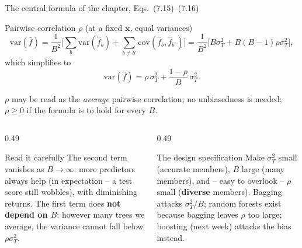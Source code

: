 \documentclass[10pt,aspectratio=169]{beamer}
\newcommand{\var}{\mathrm{var}}
\newcommand{\cov}{\mathrm{cov}}
\begin{document}
\begin{frame}{The central formula of the chapter, Eqs.\ (7.15)--(7.16)}
\small
\begin{block}{Pairwise correlation $\rho$ (at a fixed $\bm{x}$, equal variances)}
\[
  \var(\bar f)=\frac{1}{B^2}\Big[\sum_b\var(\hat f_b)+\sum_{b\ne b'}\cov(\hat f_b,\hat f_{b'})\Big]
  =\frac{1}{B^2}\Big[B\sigma_T^2+B(B-1)\rho\sigma_T^2\Big],
\]
which simplifies to
\[
  \boxed{\;\var(\bar f)=\rho\,\sigma_T^2+\frac{1-\rho}{B}\,\sigma_T^2 .\;}
\]
\end{block}
\vspace{-4pt}
{\footnotesize $\rho$ may be read as the \emph{average} pairwise correlation;
no unbiasedness is needed; $\rho\ge0$ if the formula is to hold for every $B$.}
\vspace{2pt}
\begin{columns}[T]
\begin{column}{0.49\textwidth}
\begin{block}{Read it carefully}
The second term vanishes as $B\to\infty$: more predictors always help (in
expectation -- a test score still wobbles), with diminishing returns.  The
first term does \textbf{not depend on $B$}: however many trees we average,
the variance cannot fall below $\rho\sigma_T^2$.
\end{block}
\end{column}
\begin{column}{0.49\textwidth}
\begin{block}{The design specification}
Make $\sigma_T^2$ small (accurate members), $B$ large (many members), and --
easy to overlook -- $\rho$ small (\textbf{diverse} members).  Bagging
attacks $\sigma_T^2/B$; random forests exist because bagging leaves $\rho$
too large; boosting (next week) attacks the bias instead.
\end{block}
\end{column}
\end{columns}
\end{frame}
\end{document}
